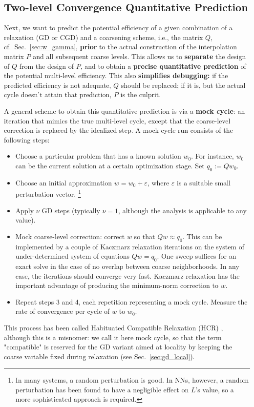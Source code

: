 \documentclass{article} %
\begin{document}
\subsection{Two-level Convergence Quantitative Prediction}
\label{sec:mock_cycle}
Next, we want to predict the potential efficiency of a given combination of a relaxation (GD or CGD) and a coarsening scheme,  i.e., the matrix $Q$, cf.~Sec.~\ref{sec:w_gamma}, \textbf{prior} to the actual construction of the interpolation matrix $P$ and all subsequent coarse levels. This allows us to \textbf{separate} the design of $Q$ from the design of $P$, and to obtain a \textbf{precise quantitative prediction} of the potential multi-level efficiency. This also \textbf{simplifies debugging:} if the predicted efficiency is not adequate, $Q$ should be replaced; if it is, but the actual cycle doesn't attain that prediction, $P$ is the culprit.

A general scheme to obtain this quantitative prediction is via a \textbf{mock cycle}: an iteration that mimics the true multi-level cycle, except that the coarse-level correction is replaced by the idealized step. A mock cycle run consists of the following steps:
\begin{itemize}
	\item Choose a particular problem that has a known solution $w_0$. For instance, $w_0$ can be the current solution at a certain optimization stage. Set $q_0 := Q w_0$.
	\item Choose an initial approximation $w = w_0 + \varepsilon$, where $\varepsilon$ is a suitable small perturbation vector. \footnote{In many systems, a random perturbation is good. In NNs, however, a random perturbation has been found to have a negligible effect on $L$'s value, so a more sophisticated approach is required.}
	\item Apply $\nu$ GD steps (typically $\nu=1$, although the analysis is applicable to any value).
	\item Mock coarse-level correction: correct $w$ so that $Q w \approx q_0$. This can be implemented by a couple of Kaczmarz relaxation iterations \cite[Sec.~1.1]{guide} on the system of under-determined system of equations $Q w = q_0$. One sweep suffices for an exact solve in the case of no overlap between coarse neighborhoods. In any case, the iterations should converge very fast. Kaczmarz relaxation has the important advantage of producing the minimum-norm correction to $w$.
	\item Repeat steps 3 and 4, each repetition representing a mock cycle. Measure the rate of convergence per cycle of $w$ to $w_0$.
\end{itemize}
This process has been called Habituated Compatible Relaxation (HCR) \cite[Sec.~14.3]{guide}, although this is a misnomer: we call it here mock cycle, so that the term "compatible" is reserved for the GD variant aimed at locality by keeping the coarse variable fixed during relaxation (see Sec.~\ref{sec:gd_local}).
\end{document}

